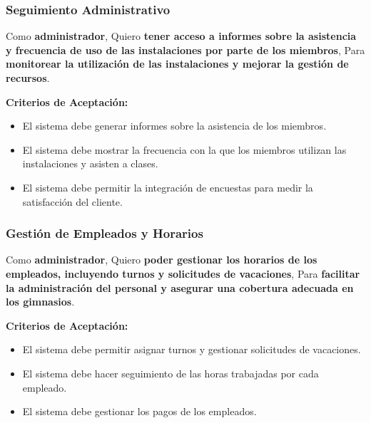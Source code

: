 \documentclass[spanish, 12pt]{article}
\providecommand{\tightlist}{\setlength{\itemsep}{0pt}
\setlength{\parskip}{0pt}}
\begin{document}
	\subsubsection{Seguimiento Administrativo}
	\label{seguimiento-administrativo-1}

	Como \textbf{administrador}, Quiero \textbf{tener acceso a informes sobre la
	asistencia y frecuencia de uso de las instalaciones por parte de los miembros},
	Para \textbf{monitorear la utilización de las instalaciones y mejorar la
	gestión de recursos}.

	\textbf{Criterios de Aceptación:}

	\begin{itemize}
		\tightlist

		\item El sistema debe generar informes sobre la asistencia de los miembros.

		\item El sistema debe mostrar la frecuencia con la que los miembros utilizan
			las instalaciones y asisten a clases.

		\item El sistema debe permitir la integración de encuestas para medir la satisfacción
			del cliente.
	\end{itemize}

	\subsubsection{Gestión de Empleados y Horarios}
	\label{gestiuxf3n-de-empleados-y-horarios}

	Como \textbf{administrador}, Quiero \textbf{poder gestionar los horarios de
	los empleados, incluyendo turnos y solicitudes de vacaciones}, Para \textbf{facilitar
	la administración del personal y asegurar una cobertura adecuada en los
	gimnasios}.

	\textbf{Criterios de Aceptación:}

	\begin{itemize}
		\tightlist

		\item El sistema debe permitir asignar turnos y gestionar solicitudes de vacaciones.

		\item El sistema debe hacer seguimiento de las horas trabajadas por cada empleado.

		\item El sistema debe gestionar los pagos de los empleados.
	\end{itemize}
\end{document}
